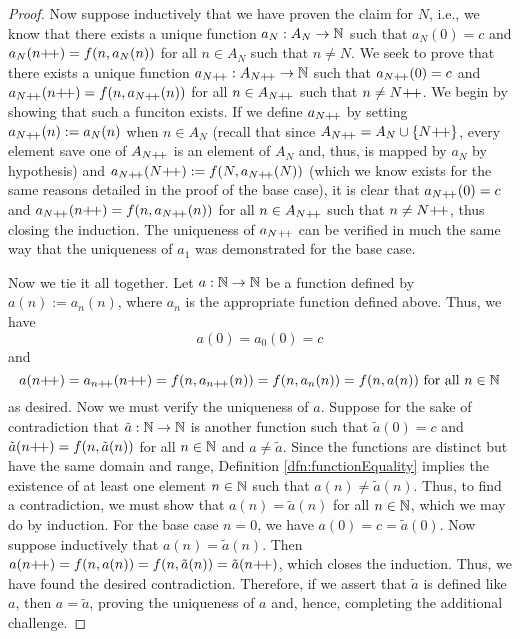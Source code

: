 \documentclass[../main.tex]{subfiles}
\begin{document}
\begin{enumerate}[ref={\thesection.\arabic*}]
\begin{proof}
        Now suppose inductively that we have proven the claim for $N$, i.e., we know that there exists a unique function $a_N:A_N\to\mathbb{N}$ such that $a_N(0)=c$ and $a_N(n{+\!+})=f(n,a_N(n))$ for all $n\in A_N$ such that $n\neq N$. We seek to prove that there exists a unique function $a_{N{+\!+}}:A_{N{+\!+}}\to\mathbb{N}$ such that $a_{N{+\!+}}(0)=c$ and $a_{N{+\!+}}(n{+\!+})=f(n,a_{N{+\!+}}(n))$ for all $n\in A_{N{+\!+}}$ such that $n\neq N{+\!+}$. We begin by showing that such a funciton exists. If we define $a_{N{+\!+}}$ by setting $a_{N{+\!+}}(n):=a_N(n)$ when $n\in A_N$ (recall that since $A_{N{+\!+}}=A_N\cup\{N{+\!+}\}$, every element save one of $A_{N{+\!+}}$ is an element of $A_N$ and, thus, is mapped by $a_N$ by hypothesis) and $a_{N{+\!+}}(N{+\!+}):=f(N,a_{N{+\!+}}(N))$ (which we know exists for the same reasons detailed in the proof of the base case), it is clear that $a_{N{+\!+}}(0)=c$ and $a_{N{+\!+}}(n{+\!+})=f(n,a_{N{+\!+}}(n))$ for all $n\in A_{N{+\!+}}$ such that $n\neq N{+\!+}$, thus closing the induction. The uniqueness of $a_{N{+\!+}}$ can be verified in much the same way that the uniqueness of $a_1$ was demonstrated for the base case.\par
        Now we tie it all together. Let $a:\mathbb{N}\to\mathbb{N}$ be a function defined by $a(n):=a_n(n)$, where $a_n$ is the appropriate function defined above. Thus, we have
        \begin{equation*}
            a(0) = a_0(0) = c
        \end{equation*}
        and
        \begin{equation*}
            a(n{+\!+}) = a_{n{+\!+}}(n{+\!+})
            = f(n,a_{n{+\!+}}(n))
            = f(n,a_n(n))
            = f(n,a(n))\text{ for all }n\in\mathbb{N}
        \end{equation*}
        as desired. Now we must verify the uniqueness of $a$. Suppose for the sake of contradiction that $\tilde{a}:\mathbb{N}\to\mathbb{N}$ is another function such that $\tilde{a}(0)=c$ and $\tilde{a}(n{+\!+})=f(n,\tilde{a}(n))$ for all $n\in\mathbb{N}$ and $a\neq\tilde{a}$. Since the functions are distinct but have the same domain and range, Definition \ref{dfn:functionEquality} implies the existence of at least one element $n\in\mathbb{N}$ such that $a(n)\neq\tilde{a}(n)$. Thus, to find a contradiction, we must show that $a(n)=\tilde{a}(n)$ for all $n\in\mathbb{N}$, which we may do by induction. For the base case $n=0$, we have $a(0)=c=\tilde{a}(0)$. Now suppose inductively that $a(n)=\tilde{a}(n)$. Then $a(n{+\!+})=f(n,a(n))=f(n,\tilde{a}(n))=\tilde{a}(n{+\!+})$, which closes the induction. Thus, we have found the desired contradiction. Therefore, if we assert that $\tilde{a}$ is defined like $a$, then $a=\tilde{a}$, proving the uniqueness of $a$ and, hence, completing the additional challenge.

\end{proof}
\end{enumerate}
\end{document}
